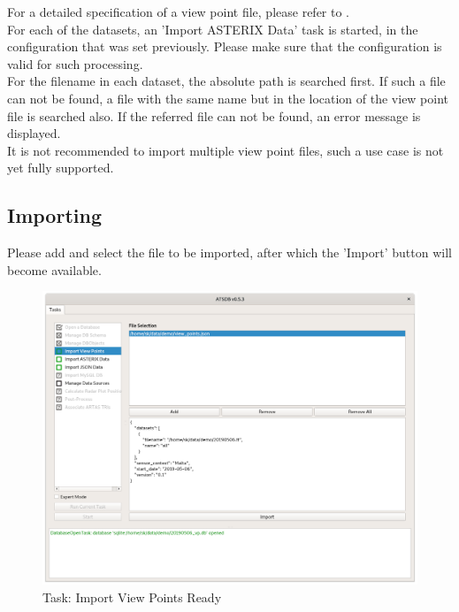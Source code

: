 For a detailed specification of a view point file, please refer to . \\

For each of the datasets, an 'Import ASTERIX Data' task is started, in the configuration that was set previously. Please make sure that the configuration is valid for such processing. \\

For the filename in each dataset, the absolute path is searched first. If such a file can not be found, a file with the same name but in the location of the view point file is searched also. If the referred file can not be found, an error message is displayed. \\

It is not recommended to import multiple view point files, such a use case is not yet fully supported.

\subsection{Importing}

Please add and select the file to be imported, after which the 'Import' button will become available. \\

\begin{figure}[H]
  \hspace*{-2.5cm}
    \includegraphics[width=19cm]{../screenshots/view_point_import_ready.png}
  \caption{Task: Import View Points Ready}
\end{figure}

